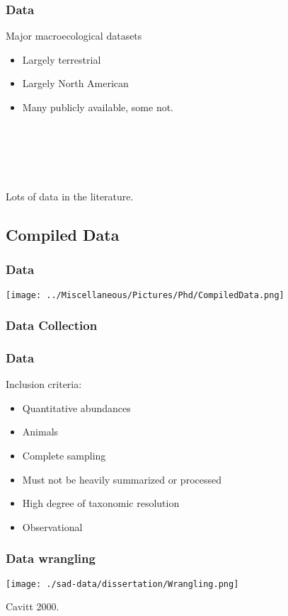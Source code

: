 \documentclass[14pt]{beamer}
\begin{document}
\begin{frame}[t]{}
\frametitle{Data}
\begin{large}
Major macroecological datasets\\
\end{large}
\begin{itemize}
\item Largely terrestrial
\item Largely North American
\item Many publicly available, some not.
\end{itemize}
~\\
~\\
~\\
~\\
\begin{large}
Lots of data in the literature.\\
\end{large}
\end{frame}


\subsection{Compiled Data}
\begin{frame}{}
\frametitle{Data}
\texttt{[image: ../Miscellaneous/Pictures/Phd/CompiledData.png]}
\end{frame}

\subsubsection{Data Collection}
\begin{frame}[t]{}
\frametitle{Data}
Inclusion criteria:
\begin{itemize}
\item Quantitative abundances
\item Animals
\item Complete sampling
\item Must not be heavily summarized or processed
\item High degree of taxonomic resolution
\item Observational
\end{itemize}
\end{frame}

\begin{frame}[t]
\frametitle{Data wrangling}
\begin{center}
\texttt{[image: ./sad-data/dissertation/Wrangling.png]}
\end{center}
\begin{tiny}
Cavitt 2000.
\end{tiny}
\end{frame}
\end{document}
